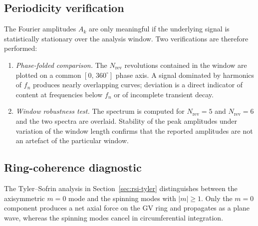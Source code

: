 \subsection{Periodicity verification}
\label{sec:spec-periodicity}
 
The Fourier amplitudes $A_k$ are only meaningful if the underlying signal is statistically stationary over the analysis window. Two verifications are therefore performed:
\begin{enumerate}
  \item \emph{Phase-folded comparison.} The $N_{\mathrm{rev}}$ revolutions contained in the window are plotted on a common $[0,\,360^\circ]$ phase axis. A signal dominated by harmonics of $f_n$ produces nearly overlapping curves; deviation is a direct indicator of content at frequencies below $f_n$ or of incomplete transient decay.
  \item \emph{Window robustness test.} The spectrum is computed for $N_{\mathrm{rev}} = 5$ and $N_{\mathrm{rev}} = 6$ and the two spectra are overlaid. Stability of the peak amplitudes under variation of the window length confirms that the reported amplitudes are not an artefact of the particular window.
\end{enumerate}
 
\subsection{Ring-coherence diagnostic}
\label{sec:spec-coherence}
 
The Tyler--Sofrin analysis in Section~\ref{sec:rsi-tyler} distinguishes between the axisymmetric $m=0$ mode and the spinning modes with $|m|\geq 1$. Only the $m=0$ component produces a net axial force on the GV ring and propagates as a plane wave, whereas the spinning modes cancel in circumferential integration.
 
